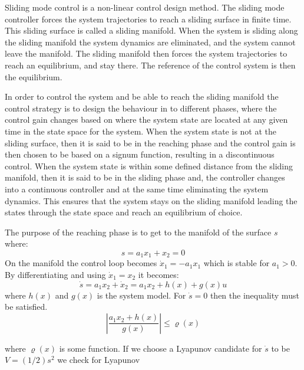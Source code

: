 Sliding mode control is a non-linear control design method. The sliding mode controller forces the system trajectories to
reach a sliding surface in finite time. This sliding surface is called a sliding manifold. When the system is sliding
along the sliding manifold the system dynamics are eliminated, and the system cannot leave the manifold. The sliding
manifold then forces the system trajectories to reach an equilibrium, and stay there. The reference of the control
system is then the equilibrium. 

In order to control the system and be able to reach the sliding manifold the control strategy is to design the behaviour
in to different phases, where the control gain changes based on where the system state are located at any given time in
the state space for the system. When the system state is not at the sliding surface, then it is said to be in the
reaching phase and the control gain is then chosen to be based on a signum function, resulting in a discontinuous control. When the system state is within some defined distance from the sliding manifold, then it is said to be in the
sliding phase and, the controller changes into a continuous controller and at the same time
eliminating the system dynamics. This ensures that the system stays on the sliding manifold leading the states through
the state space and reach an equilibrium of choice.

The purpose of the reaching phase is to get to the manifold of the surface $s$ where:
\begin{equation}
  s = a_1 x_1 + x_2 = 0
\end{equation}
On the manifold the control loop becomes $ \dot{x}_1 = - a_1 x_1$ which is stable for $ a_1 > 0$.
By differentiating and using $ \dot{x}_1 = x_2 $ it becomes:
\begin{equation}
        \dot{s} = a_1 x_2 + \dot{x}_2 = a_1 x_2 + h(x) + g(x)u
\end{equation}
where $h(x)$ and $g(x)$ is the system model. For $\dot{s} = 0$ then the inequality must be satisfied.
\begin{equation}
        \left\vert \frac{a_1 x_2 + h(x)}{g(x)} \right\vert \leq \varrho(x)
\end{equation}

where $\varrho(x)$ is some function. If we choose a Lyapunov candidate for $\dot{s}$ to be $V = (1/2)s^2$ we check for Lyapunov


